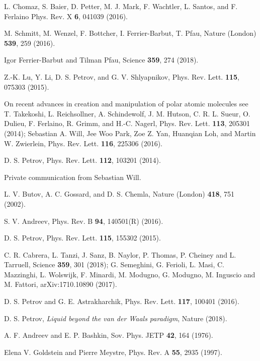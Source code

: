 \documentclass[reprint,superscriptaddress,showpacs,nofootinbib,aps,pra]{revtex4-1}
\begin{document}
\begin{thebibliography}{99}
 L. Chomaz, S. Baier, D. Petter, M. J. Mark, F. Wachtler, L. Santos, and F. Ferlaino
Phys. Rev. X \textbf{6}, 041039 (2016).

 M. Schmitt, M. Wenzel, F. Bottcher, I. Ferrier-Barbut, T. Pfau, Nature (London) \textbf{539}, 259 (2016).

 Igor Ferrier-Barbut and Tilman Pfau, Science \textbf{359}, 274 (2018).

 Z.-K. Lu, Y. Li, D. S. Petrov, and G. V. Shlyapnikov, Phys. Rev. Lett. \textbf{115}, 075303 (2015).

 On recent advances in creation and manipulation of polar atomic molecules see T. Takekoshi, L. Reichsollner, A. Schindewolf, J. M. Hutson, C. R. L. Sueur, O. Dulieu, F. Ferlaino, R. Grimm, and H.-C. Nagerl, Phys. Rev. Lett. \textbf{113}, 205301 (2014); Sebastian A. Will, Jee Woo Park, Zoe Z. Yan, Huanqian Loh, and Martin W. Zwierlein, Phys. Rev. Lett. \textbf{116}, 225306 (2016). 

 D. S. Petrov, Phys. Rev. Lett. \textbf{112}, 103201 (2014).

 Private communication from Sebastian Will.

 L. V. Butov, A. C. Gossard, and D. S. Chemla, Nature (London) \textbf{418}, 751 (2002).

 S. V. Andreev, Phys. Rev. B \textbf{94}, 140501(R) (2016).

 D. S. Petrov, Phys. Rev. Lett. \textbf{115}, 155302 (2015).

 C. R. Cabrera, L. Tanzi, J. Sanz, B. Naylor, P. Thomas, P. Cheiney and L. Tarruell, Science \textbf{359}, 301 (2018); G. Semeghini, G. Ferioli, L. Masi, C. Mazzinghi, L. Wolswijk, F. Minardi, M. Modugno, G. Modugno, M. Inguscio and M. Fattori, arXiv:1710.10890 (2017).

 D. S. Petrov and G. E. Astrakharchik, Phys. Rev. Lett. \textbf{117}, 100401 (2016).

 D. S. Petrov, \textit{Liquid beyond the van der Waals paradigm}, Nature (2018).

 A. F. Andreev and E. P. Bashkin, Sov. Phys. JETP \textbf{42}, 164 (1976).

 Elena V. Goldstein and Pierre Meystre, Phys. Rev. A \textbf{55}, 2935 (1997).


\end{thebibliography}
\end{document}
